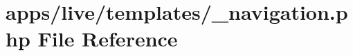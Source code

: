 \hypertarget{live_2templates_2__navigation_8php}{\section{apps/live/templates/\-\_\-navigation.php File Reference}
\label{live_2templates_2__navigation_8php}
}
